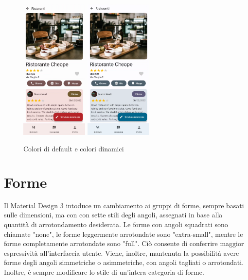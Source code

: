 \documentclass[12pt, a4paper]{report}
\begin{document}
		\begin{figure}[h]
   			\centering
   			\includegraphics[width=0.3\textwidth]{colori_default} %
   			\includegraphics[width=0.3\textwidth]{colori_dinamici} %
 			\caption{Colori di default e colori dinamici}
 			\label{gerarchia_colori}
		\end{figure}


\cleardoublepage


	\section{Forme}
	Il Material Design 3 intoduce un cambiamento ai gruppi di forme, sempre basati sulle dimensioni, ma con con sette stili degli angoli, assegnati in base alla quantità di arrotondamento desiderata. Le forme con angoli squadrati sono chiamate "none", le forme leggermente arrotondate sono "extra-small", mentre le forme completamente arrotondate sono "full".
	Ciò consente di conferrire maggior espressività all'interfaccia utente. Viene, inoltre, mantenuta la possibilità avere forme degli angoli simmetriche o asimmetriche, con angoli tagliati o arrotondati. Inoltre, è sempre modificare lo stile di un'intera categoria di forme.
\end{document}
